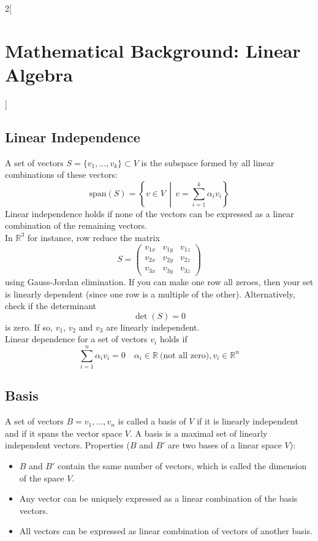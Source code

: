 \documentclass[oneside,fontsize=11pt,paper=a4]{scrartcl}
\begin{document}
\begin{multicols}{2}[\section{Mathematical Background: Linear Algebra}]
\subsection{Linear Independence}
A set of vectors $S = \{v_1, \dots, v_k \} \subset V$ is the subspace formed by all linear combinations of these vectors:
\begin{equation*}
	\text{span}(S) = \left\{ v \in V \,\middle\vert\, v = \sum_{i=1}^k \alpha_i v_i \right\}
\end{equation*}
Linear independence holds if none of the vectors can be expressed as a linear combination of the remaining vectors.\\
In $\mathbb{R}^3$ for instance, row reduce the matrix
\begin{equation*}
	S = \begin{pmatrix} v_{1x} &  v_{1y} & v_{1z}\\  v_{2x} & v_{2y} & v_{2z} \\ v_{3x} & v_{3y} & v_{3z} \end{pmatrix}
\end{equation*}
using Gauss-Jordan elimination.
If you can make one row all zeroes, then your set is linearly dependent (since one row is a multiple of the other).
Alternatively, check if the determinant 
\begin{equation*}
	\det(S) = 0
\end{equation*}
is zero. If so, $v_1$, $v_2$ and $v_3$ are linearly independent.\\
Linear dependence for a set of vectors $v_i$ holds if
\begin{equation*}
	\sum_{i=1}^{n} \alpha_i v_i = 0 \quad \alpha_i \in \mathbb{R} \ \text{(not all zero)}, v_i \in \mathbb{R}^n
\end{equation*}

\subsection{Basis}
A set of vectors $B = {v_1, \dots, v_n}$ is called a basis of $V$ if it is linearly independent and if it spans the vector space $V$. A basis is a maximal set of linearly independent vectors. Properties ($B$ and $B'$ are two bases of a linear space $V$):
\begin{itemize}
	\item $B$ and $B'$ contain the same number of vectors, which is called the dimension of the space $V$.
	\item Any vector can be uniquely expressed as a linear combination of the basis vectors.
	\item All vectors can be expressed as linear combination of vectors of another basis.
\end{itemize}


\end{multicols}
\end{document}

